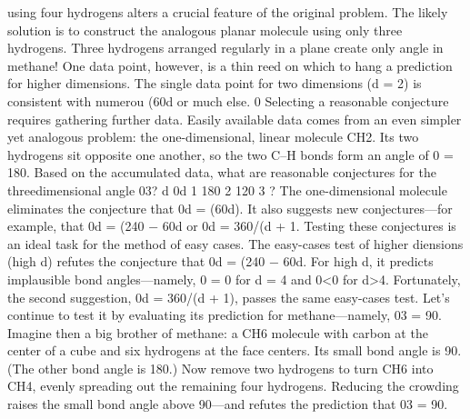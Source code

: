 \documentclass[a4paper]{article}
\begin{document}
using four hydrogens alters a crucial feature of the original
problem. The likely solution is to construct the analogous
planar molecule using only three hydrogens.
Three hydrogens arranged regularly in a plane create only
angle in methane! One data point, however, is a thin reed
on which to hang a prediction for higher dimensions. The
single data point for two dimensions (d = 2) is consistent with numerou
(60d or much else.
0 Selecting a reasonable conjecture requires gathering further
data. Easily available data comes from an even simpler yet
analogous problem: the one-dimensional, linear molecule
CH2. Its two hydrogens sit opposite one another, so the
two C–H bonds form an angle of 0 = 180.
Based on the accumulated data, what are reasonable conjectures for the threedimensional
angle 03?
d 0d
1 180
2 120
3 ?
The one-dimensional molecule eliminates the conjecture that
0d = (60d). It also suggests new conjectures—for example,
that 0d = (240 − 60d or 0d = 360/(d + 1. Testing these
conjectures is an ideal task for the method of easy cases.
The easy-cases test of higher diensions (high d) refutes the
conjecture that 0d = (240 − 60d. For high d, it predicts
implausible bond angles—namely, 0 = 0 for d = 4 and 0<0 for d>4.
Fortunately, the second suggestion, 0d = 360/(d + 1), passes the same
easy-cases test. Let’s continue to test it by evaluating its prediction for
methane—namely, 03 = 90. Imagine then a big brother of methane: a
CH6 molecule with carbon at the center of a cube and six hydrogens at the
face centers. Its small bond angle is 90. (The other bond angle is 180.)
Now remove two hydrogens to turn CH6 into CH4, evenly spreading out
the remaining four hydrogens. Reducing the crowding raises the small
bond angle above 90—and refutes the prediction that 03 = 90.
\end{document}
